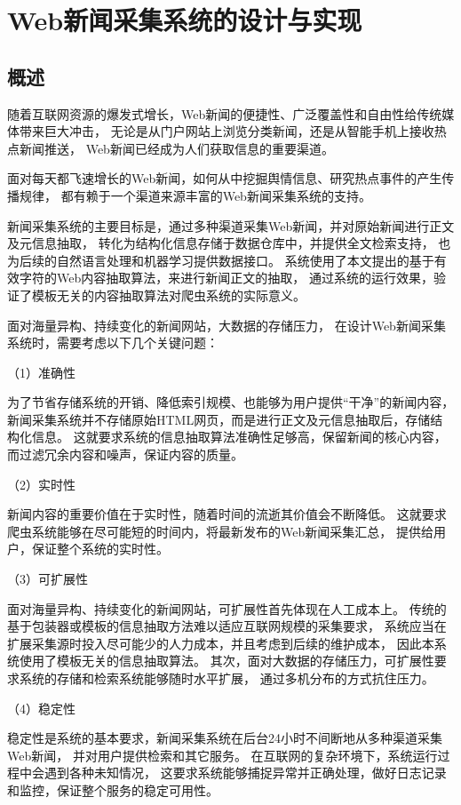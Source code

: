
\chapter{Web新闻采集系统的设计与实现}

\section{概述}
\label{sec:system-intro}

随着互联网资源的爆发式增长，Web新闻的便捷性、广泛覆盖性和自由性给传统媒体带来巨大冲击，
无论是从门户网站上浏览分类新闻，还是从智能手机上接收热点新闻推送，
Web新闻已经成为人们获取信息的重要渠道。

面对每天都飞速增长的Web新闻，如何从中挖掘舆情信息、研究热点事件的产生传播规律，
都有赖于一个渠道来源丰富的Web新闻采集系统的支持。

新闻采集系统的主要目标是，通过多种渠道采集Web新闻，并对原始新闻进行正文及元信息抽取，
转化为结构化信息存储于数据仓库中，并提供全文检索支持，
也为后续的自然语言处理和机器学习提供数据接口。
系统使用了本文提出的基于有效字符的Web内容抽取算法，来进行新闻正文的抽取，
通过系统的运行效果，验证了模板无关的内容抽取算法对爬虫系统的实际意义。

面对海量异构、持续变化的新闻网站，大数据的存储压力，
在设计Web新闻采集系统时，需要考虑以下几个关键问题：

（1）准确性

为了节省存储系统的开销、降低索引规模、也能够为用户提供“干净”的新闻内容，
新闻采集系统并不存储原始HTML网页，而是进行正文及元信息抽取后，存储结构化信息。
这就要求系统的信息抽取算法准确性足够高，保留新闻的核心内容，
而过滤冗余内容和噪声，保证内容的质量。

（2）实时性

新闻内容的重要价值在于实时性，随着时间的流逝其价值会不断降低。
这就要求爬虫系统能够在尽可能短的时间内，将最新发布的Web新闻采集汇总，
提供给用户，保证整个系统的实时性。

（3）可扩展性

面对海量异构、持续变化的新闻网站，可扩展性首先体现在人工成本上。
传统的基于包装器或模板的信息抽取方法难以适应互联网规模的采集要求，
系统应当在扩展采集源时投入尽可能少的人力成本，并且考虑到后续的维护成本，
因此本系统使用了模板无关的信息抽取算法。
其次，面对大数据的存储压力，可扩展性要求系统的存储和检索系统能够随时水平扩展，
通过多机分布的方式抗住压力。

（4）稳定性

稳定性是系统的基本要求，新闻采集系统在后台24小时不间断地从多种渠道采集Web新闻，
并对用户提供检索和其它服务。
在互联网的复杂环境下，系统运行过程中会遇到各种未知情况，
这要求系统能够捕捉异常并正确处理，做好日志记录和监控，保证整个服务的稳定可用性。

